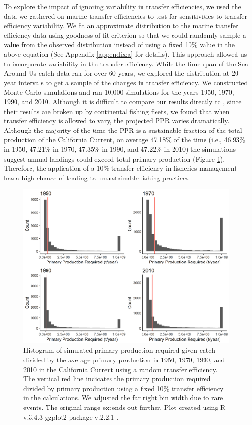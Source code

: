 \documentclass[oneside,12pt,final]{sty/ucthesis-CA2012}
\let\cite\citep                             %
\begin{document}
\begin{mainmatter}
To explore the impact of ignoring variability in transfer efficiencies, we used the data we gathered on marine transfer efficiencies to test for sensitivities to transfer efficiency variability. We fit an approximate distribution to the marine transfer efficiency data using goodness-of-fit criterion so that we could randomly sample a value from the observed distribution instead of using a fixed 10\% value in the above equation (See Appendix \ref{appendix:a} for details). This approach allowed us to incorporate variability in the transfer efficiency. While the time span of the Sea Around Us catch data ran for over 60 years, we explored the distribution at 20 year intervals to get a sample of the changes in transfer efficiency. We constructed Monte Carlo simulations and ran 10,000 simulations for the years 1950, 1970, 1990, and 2010. Although it is difficult to compare our results directly to \citet{watson2014primary}, since their results are broken up by continental fishing fleets, we found that when transfer efficiency is allowed to vary, the projected PPR varies dramatically. Although the majority of the time the PPR is a sustainable fraction of the total production of the California Current, on average 47.18\% of the time (i.e., 46.93\% in 1950, 47.21\% in 1970, 47.35\% in 1990, and 47.22\% in 2010) the simulations suggest annual landings could exceed total primary production (Figure \ref{ppr}). Therefore, the application of a 10\% transfer efficiency in fisheries management has a high chance of leading to unsustainable fishing practices. 

\begin{figure}[H]
     \centering
       \includegraphics[width=.8\textwidth]{fig/hist_ppr_1950_2010}
    \caption{Histogram of simulated primary production required given catch divided by the average primary production in 1950, 1970, 1990, and 2010 in the California Current using a random transfer efficiency. The vertical red line indicates the primary production required divided by primary production using a fixed 10\% transfer efficiency in the calculations. We adjusted the far right bin width due to rare events. The original range extends out further. Plot created using R v.3.4.3 \cite{Rcite} ggplot2 package v.2.2.1 \cite{ggplot}. }
    \label{ppr}
\end{figure}


\end{mainmatter}
\end{document}
